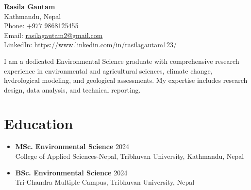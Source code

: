 \documentclass[a4paper,10pt]{article}
\begin{document}
\begin{center}
    {\LARGE \textbf{Rasila Gautam}}\\
    Kathmandu, Nepal\\
    Phone: +977 9868125455\\
    Email: \href{mailto:rasilagautam2@gmail.com}{rasilagautam2@gmail.com}\\
    LinkedIn: \url{https://www.linkedin.com/in/rasilagautam123/}
\end{center}

I am a dedicated Environmental Science graduate with comprehensive research experience in environmental and agricultural sciences, climate change, hydrological modeling, and geological assessments. My expertise includes research design, data analysis, and technical reporting.

\section{Education}

\begin{itemize}
\item \textbf{MSc. Environmental Science} \hfill 2024\\
College of Applied Sciences-Nepal, Tribhuvan University, Kathmandu, Nepal\\

\item \textbf{BSc. Environmental Science} \hfill 2024\\
Tri-Chandra Multiple Campus, Tribhuvan University, Nepal\\
\end{itemize}
\end{document}

